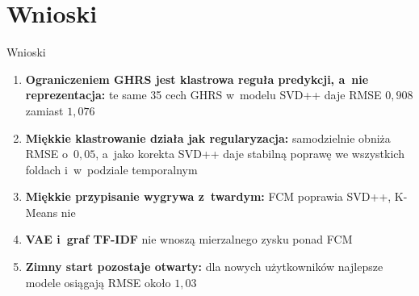 \documentclass[red]{beamer}
\begin{document}
    \section{Wnioski}
    \begin{frame}{Wnioski}
        \small
        \begin{enumerate}
            \item \textbf{Ograniczeniem GHRS jest klastrowa reguła predykcji, a~nie
                  reprezentacja:}
                  te same 35 cech GHRS w~modelu SVD++ daje RMSE $0{,}908$ zamiast $1{,}076$
            \item \textbf{Miękkie klastrowanie działa jak regularyzacja:} samodzielnie
                  obniża RMSE o~$0{,}05$, a~jako korekta SVD++ daje stabilną poprawę
                  we wszystkich foldach i~w~podziale temporalnym
            \item \textbf{Miękkie przypisanie wygrywa z~twardym:} FCM poprawia SVD++,
                  K-Means nie
            \item \textbf{VAE i~graf TF-IDF} nie wnoszą mierzalnego zysku ponad FCM
            \item \textbf{Zimny start pozostaje otwarty:} dla nowych użytkowników
                  najlepsze modele osiągają RMSE około $1{,}03$
        \end{enumerate}
    \end{frame}
\end{document}
